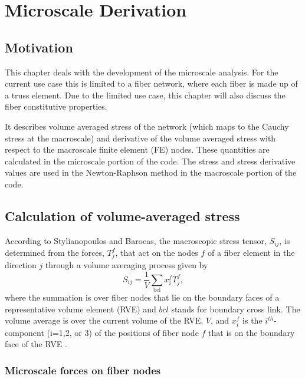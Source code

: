 \chapter{Microscale Derivation}
\section{Motivation}

This chapter deals with the development of the microscale analysis. For the current use case this is limited to a fiber network, where each fiber is made up of a truss element. Due to the limited use case, this chapter will also discuss the fiber constitutive properties. 

It describes volume averaged stress of the network (which maps to the Cauchy stress at the macroscale) and derivative of the volume averaged stress with respect to the macroscale finite element (FE) nodes. These quantities are calculated in the microscale portion of the code. The stress and stress derivative values are used in the Newton-Raphson method in the macroscale portion of the code.


\section{Calculation of volume-averaged stress}
\label{sec:macrostress}

According to Stylianopoulos and Barocas, the macroscopic stress tensor, $S_{ij}$, is determined from the forces, $T_j^f$, that act on the nodes $f$ of a fiber element in the direction $j$ through a volume averaging process given by
%
\begin{equation}
S_{ij} = \frac{1}{V} \sum_{\text{bcl}} x_i^f T_j^f,
\label{S_ij}
\end{equation}
%
where the summation is over fiber nodes that lie on the boundary faces of a representative volume element (RVE) and $bcl$ stands for boundary cross link. The volume average is over the current volume of the RVE, $V$, and $x_i^f$ is the $i^{th}$-component (i=1,2, or 3) of the positions of fiber node $f$ that is on the boundary face of the RVE \cite{Stylianopoulos:2007dp,nemat-nasser_micromechanics:1999}.

\subsection{Microscale forces on fiber nodes}

